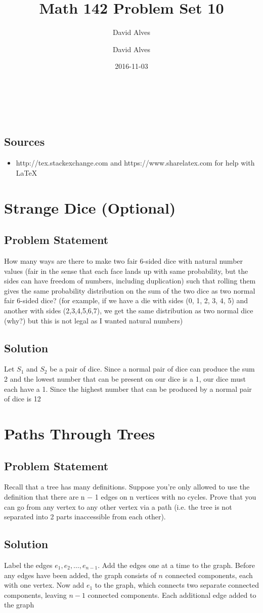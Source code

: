\documentclass[12pt]{article}
\author{David Alves}
\title{Math 142 Problem Set 10}
\author{David Alves}
\date{2016-11-03}
\newcommand{\ProblemStatement}[1]{
\subsection*{Problem Statement}
#1
\subsection*{Solution}
}
\begin{document}

\begin{center}
\large \thetitle \\
\theauthor \\
\thedate
\end{center}

\subsection*{Sources}

    \begin{itemize}
    \item http://tex.stackexchange.com and https://www.sharelatex.com for help with \LaTeX
    \end{itemize}

\section{Strange Dice (Optional)}
\ProblemStatement{
How many ways are there to make two fair 6-sided dice with natural number values (fair in the sense that each face lands up with same probability, but the sides can have freedom of numbers, including duplication) such that rolling them gives the same probability distribution on the sum of the two dice as two normal fair 6-sided dice? (for example, if we have a die with sides (0, 1, 2, 3, 4, 5) and another with sides (2,3,4,5,6,7), we get the same distribution as two normal dice (why?) but this is not legal as I wanted natural numbers)
}

Let $S_1$ and $S_2$ be a pair of dice.
Since a normal pair of dice can produce the sum 2 and the lowest number that can be present on our dice is a 1, our dice must each have a 1. Since the highest number that can be produced by a normal pair of dice is 12

\section{Paths Through Trees}
\ProblemStatement{
Recall that a tree has many definitions. Suppose you're only allowed to use the definition that there are n − 1 edges on n vertices with no cycles. Prove that you can go from any vertex to any other vertex via a path (i.e. the tree is not separated into 2 parts inaccessible from each other).
}

Label the edges $e_1, e_2, \dots, e_{n-1}$. Add the edges one at a time to the graph. Before any edges have been added, the graph consists of $n$ connected components, each with one vertex. Now add $e_1$ to the graph, which connects two separate connected components, leaving $n-1$ connected components. Each additional edge added to the graph 
\end{document}
